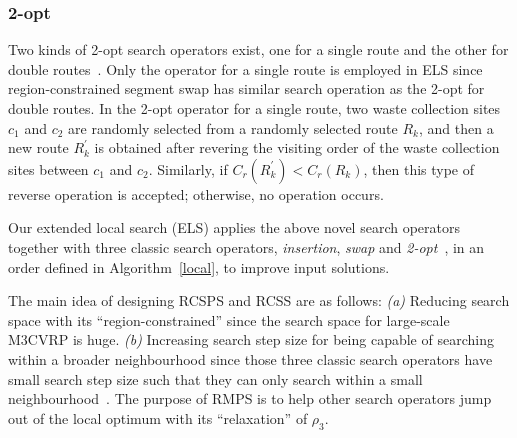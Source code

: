 \documentclass[journal]{IEEEtran}
\begin{document}
\subsubsection{2-opt} Two kinds of 2-opt search operators exist, one for a single route and the other for double routes~\cite{tang2009memetic}. Only the operator for a single route is employed in ELS since region-constrained segment swap has similar search operation as the 2-opt for double routes. In the 2-opt operator for a single route, two waste collection sites $c_1$ and $c_2$ are randomly selected from a randomly selected route $R_k$, and then a new route $R_{k}^{'}$ is obtained after revering the visiting order of the waste collection sites between $c_1$ and $c_2$. Similarly, if $C_r(R_{k}^{'})<C_r(R_k)$, then this type of reverse operation is accepted; otherwise, no operation occurs.

Our extended local search (ELS) applies the above novel search operators together with three classic search operators, \emph{insertion}, \emph{swap} and \emph{2-opt}~\cite{BeullensA}, in an order defined in Algorithm~\ref{local}, to improve input solutions. 

The main idea of designing RCSPS and RCSS are as follows: \emph{(a)} Reducing search space with its ``region-constrained'' since the search space for large-scale M3CVRP is huge. \emph{(b)} Increasing search step size for being capable of searching within a broader neighbourhood since those three classic search operators have small search step size such that they can only search within a small neighbourhood~\cite{tang2009memetic}. The purpose of RMPS is to help other search operators jump out of the local optimum with its ``relaxation'' of $\rho_3$.
\end{document}
